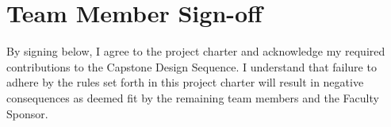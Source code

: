 \begin{minipage}{\textwidth}
\section{Team Member Sign-off}
By signing below, I agree to the project charter and acknowledge my required contributions to the Capstone Design Sequence. I understand that failure to adhere by the rules set forth in this project charter will result in negative consequences as deemed fit by the remaining team members and the Faculty Sponsor. 

\signatures
\end{minipage}

